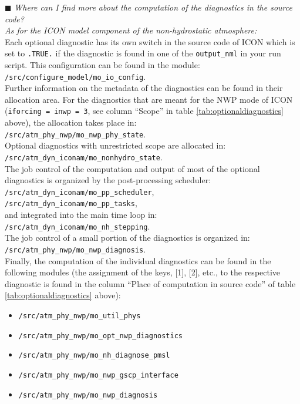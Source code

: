 $\blacksquare$ \emph{Where can I find more about the computation of the diagnostics in the source code?} \\

\emph{As for the ICON model component of the non-hydrostatic atmosphere:}\\

Each optional diagnostic has its own switch in the source code of ICON
which is set to \texttt{.TRUE.} if the diagnostic is found in one of the \texttt{output\_nml} in your run script.
This configuration can be found in the module: \\
\texttt{/src/configure\_model/mo\_io\_config}. \\

Further information on the metadata of the diagnostics can be found
in their allocation area.
For the diagnostics that are meant for the NWP mode of ICON
(\texttt{iforcing = inwp = 3}, see column ``Scope'' in table \ref{tab:optionaldiagnostics} above),
the allocation takes place in:\\
\texttt{/src/atm\_phy\_nwp/mo\_nwp\_phy\_state}.\\
Optional diagnostics with unrestricted scope are allocated in:\\
\texttt{/src/atm\_dyn\_iconam/mo\_nonhydro\_state}.\\

The job control of the computation and output of most of the optional diagnostics
is organized by the post-processing scheduler:\\
\texttt{/src/atm\_dyn\_iconam/mo\_pp\_scheduler}, \\
\texttt{/src/atm\_dyn\_iconam/mo\_pp\_tasks}, \\
and integrated into the main time loop in:\\
\texttt{/src/atm\_dyn\_iconam/mo\_nh\_stepping}.\\
The job control of a small portion of the diagnostics
is organized in: \\
\texttt{/src/atm\_phy\_nwp/mo\_nwp\_diagnosis}.\\

Finally, the computation of the individual diagnostics can be found
in the following modules
(the assignment of the keys, {[1]}, {[2]}, etc., to the respective diagnostic
is found in the column ``Place of computation in source code'' of table \ref{tab:optionaldiagnostics} above):
%
\begin{itemize}
\setlength\itemsep{-0.3em}
\item[{[1]}] \texttt{/src/atm\_phy\_nwp/mo\_util\_phys}
\item[{[2]}] \texttt{/src/atm\_phy\_nwp/mo\_opt\_nwp\_diagnostics}
\item[{[3]}] \texttt{/src/atm\_phy\_nwp/mo\_nh\_diagnose\_pmsl}
\item[{[4]}] \texttt{/src/atm\_phy\_nwp/mo\_nwp\_gscp\_interface}
\item[{[5]}] \texttt{/src/atm\_phy\_nwp/mo\_nwp\_diagnosis}
\end{itemize}
%

